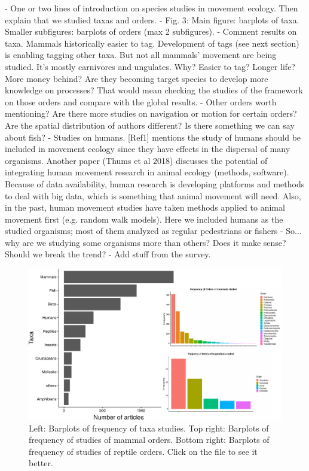 \documentclass[9pt,twocolumn,twoside,lineno]{pnas-new}
\begin{document}
- One or two lines of introduction on species studies in movement ecology. Then explain that we studied taxas and orders.
- Fig. 3: Main figure: barplots of taxa. Smaller subfigures: barplots of orders (max 2 subfigures).
- Comment results on taxa. Mammals historically easier to tag. Development of tags (see next section) is enabling tagging other taxa. But not all mammals' movement are being studied. It's mostly carnivores and ungulates. Why? Easier to tag? Longer life? More money behind? Are they becoming target species to develop more knowledge on processes? That would mean checking the studies of the framework on those orders and compare with the global results. 
- Other orders worth mentioning? Are there more studies on navigation or motion for certain orders? Are the spatial distribution of authors different? Is there something we can say about fish?
- Studies on humans. [Ref1] mentions the study of humans should be included in movement ecology since they have effects in the dispersal of many organisms. Another paper (Thums et al 2018) discusses the potential of integrating human movement research in animal ecology (methods, software). Because of data availability, human research is developing platforms and methods to deal with big data, which is something that animal movement will need. Also, in the past, human movement studies have taken methods applied to animal movement first (e.g. random walk models). Here we included humans as the studied organisms; most of them analyzed as regular pedestrians or fishers  
- So... why are we studying some organisms more than others? Does it make sense? Should we break the trend?
- Add stuff from the survey.

\begin{figure}%
\centering
\includegraphics[width=.8\linewidth]{./img/Species.pdf}
\caption{Left: Barplots of frequency of taxa studies. Top right: Barplots of frequency of studies of mammal orders. Bottom right: Barplots of frequency of studies of reptile orders. Click on the file to see it better. }
\label{fig:species}
\end{figure}
\end{document}
